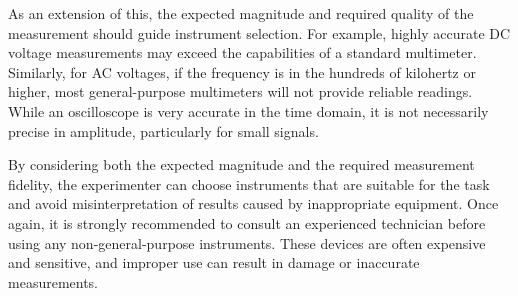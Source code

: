As an extension of this, the expected magnitude and required quality of the measurement should guide instrument selection. For example, highly accurate DC voltage measurements may exceed the capabilities of a standard multimeter. Similarly, for AC voltages, if the frequency is in the hundreds of kilohertz or higher, most general-purpose multimeters will not provide reliable readings. While an oscilloscope is very accurate in the time domain, it is not necessarily precise in amplitude, particularly for small signals.

By considering both the expected magnitude and the required measurement fidelity, the experimenter can choose instruments that are suitable for the task and avoid misinterpretation of results caused by inappropriate equipment. Once again, it is strongly recommended to consult an experienced technician before using any non-general-purpose instruments. These devices are often expensive and sensitive, and improper use can result in damage or inaccurate measurements.